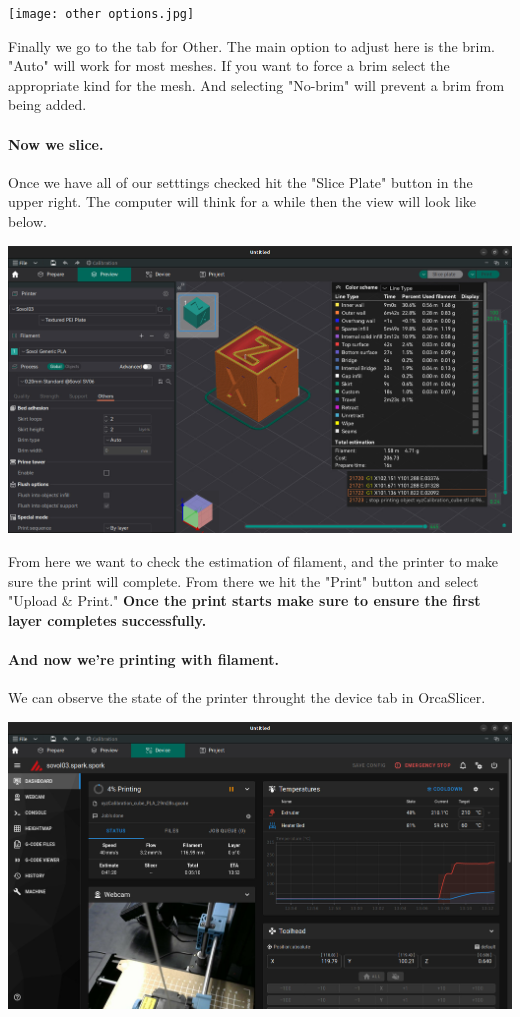 \documentclass[12pt,legalpaper]{article}
\begin{document}
\texttt{[image: other options.jpg]}

Finally we go to the tab for Other. The main option to adjust here is the brim. "Auto" will work for most meshes.
If you want to force a brim select the appropriate kind for the mesh. And selecting "No-brim" will prevent a brim from being added.

\paragraph{Now we slice.}
Once we have all of our setttings checked hit the "Slice Plate" button in the upper right. The computer will think for a while then the view will look like below.

\includegraphics*{sliced.jpg}

From here we want to check the estimation of filament, and the printer to make sure the print will complete. 
From there we hit the "Print" button and select "Upload \& Print."
\textbf{Once the print starts make sure to ensure the first layer completes successfully.}

\paragraph{And now we're printing with filament.}
We can observe the state of the printer throught the device tab in OrcaSlicer.

\includegraphics*{status.jpg}
\end{document}

